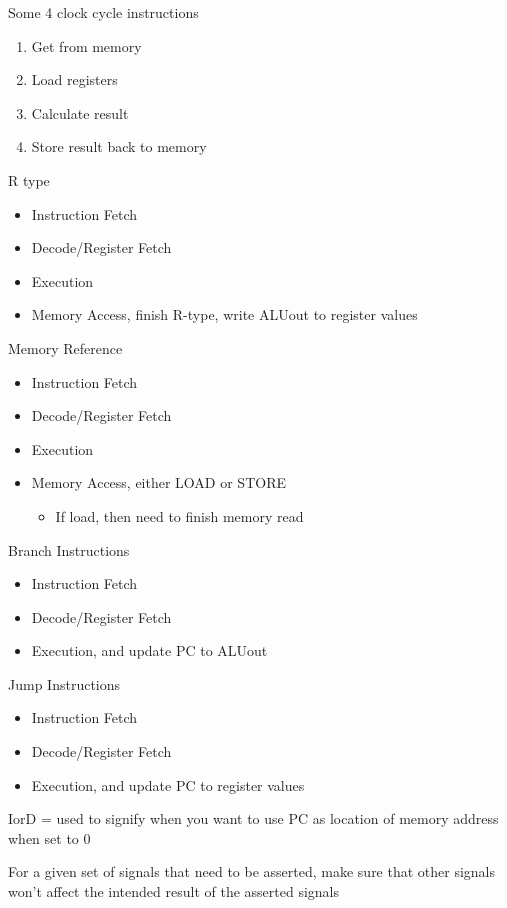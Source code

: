 \documentclass{article}
\begin{document}
		Some 4 clock cycle instructions
		\begin{enumerate}
			\item Get from memory
			\item Load registers
			\item Calculate result
			\item Store result back to memory
		\end{enumerate}

		R type
		\begin{itemize}
			\item Instruction Fetch
			\item Decode/Register Fetch
			\item Execution
			\item Memory Access, finish R-type, write ALUout to register values
		\end{itemize}

		Memory Reference
		\begin{itemize}
			\item Instruction Fetch
			\item Decode/Register Fetch
			\item Execution
			\item Memory Access, either LOAD or STORE
			\begin{itemize}
				\item If load, then need to finish memory read
			\end{itemize}
		\end{itemize}

		Branch Instructions
		\begin{itemize}
			\item Instruction Fetch
			\item Decode/Register Fetch
			\item Execution, and update PC to ALUout
		\end{itemize}

		Jump Instructions
		\begin{itemize}
			\item Instruction Fetch
			\item Decode/Register Fetch
			\item Execution, and update PC to register values
		\end{itemize}

		IorD = used to signify when you want to use PC as location of memory address when set to 0

		For a given set of signals that need to be asserted, make sure that other signals won't affect the intended result of the asserted signals
\end{document}
